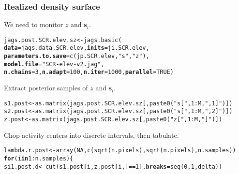 \documentclass[color=usenames,dvipsnames]{beamer}\usepackage[]{graphicx}\usepackage[]{color}
\makeatletter
\newcommand{\hlnum}[1]{\textcolor[rgb]{0.69,0.494,0}{#1}}%
\newcommand{\hlstr}[1]{\textcolor[rgb]{0.749,0.012,0.012}{#1}}%
\newcommand{\hlopt}[1]{\textcolor[rgb]{0,0,0}{#1}}%
\newcommand{\hlstd}[1]{\textcolor[rgb]{0,0,0}{#1}}%
\newcommand{\hlkwa}[1]{\textcolor[rgb]{0,0,0}{\textbf{#1}}}%
\newcommand{\hlkwb}[1]{\textcolor[rgb]{0,0.341,0.682}{#1}}%
\newcommand{\hlkwc}[1]{\textcolor[rgb]{0,0,0}{\textbf{#1}}}%
\newcommand{\hlkwd}[1]{\textcolor[rgb]{0.004,0.004,0.506}{#1}}%
\newenvironment{kframe}{%
 \def\at@end@of@kframe{}%
 \ifinner\ifhmode%
  \def\at@end@of@kframe{\end{minipage}}%
  \begin{minipage}{\columnwidth}%
 \fi\fi%
 \def\FrameCommand##1{\hskip\@totalleftmargin \hskip-\fboxsep
 \colorbox{shadecolor}{##1}\hskip-\fboxsep
     \hskip-\linewidth \hskip-\@totalleftmargin \hskip\columnwidth}%
 \MakeFramed {\advance\hsize-\width
   \@totalleftmargin\z@ \linewidth\hsize
   \@setminipage}}%
 {\par\unskip\endMakeFramed%
 \at@end@of@kframe}
\newenvironment{knitrout}{}{} %
\newcommand{\bsi}{{\bm s}_i}
\makeatother
\begin{document}
\begin{frame}[fragile]
  \frametitle{Realized density surface}
  We need to monitor $z$ and $\bsi$.
\begin{knitrout}\scriptsize
{}\color{fgcolor}\begin{kframe}
\begin{alltt}
\hlstd{jags.post.SCR.elev.sz} \hlkwb{<-} \hlkwd{jags.basic}\hlstd{(}
    \hlkwc{data}\hlstd{=jags.data.SCR.elev,} \hlkwc{inits}\hlstd{=ji.SCR.elev,}
    \hlkwc{parameters.to.save}\hlstd{=}\hlkwd{c}\hlstd{(jp.SCR.elev,}\hlstr{"s"}\hlstd{,}\hlstr{"z"}\hlstd{),}
    \hlkwc{model.file}\hlstd{=}\hlstr{"SCR-elev-v2.jag"}\hlstd{,}
    \hlkwc{n.chains}\hlstd{=}\hlnum{3}\hlstd{,} \hlkwc{n.adapt}\hlstd{=}\hlnum{100}\hlstd{,} \hlkwc{n.iter}\hlstd{=}\hlnum{1000}\hlstd{,} \hlkwc{parallel}\hlstd{=}\hlnum{TRUE}\hlstd{)}
\end{alltt}
\end{kframe}
\end{knitrout}
\pause \vfill
  Extract posterior samples of $z$ and $\bsi$. 
\begin{knitrout}\scriptsize
{}\color{fgcolor}\begin{kframe}
\begin{alltt}
\hlstd{s1.post} \hlkwb{<-} \hlkwd{as.matrix}\hlstd{(jags.post.SCR.elev.sz[,}\hlkwd{paste0}\hlstd{(}\hlstr{"s["}\hlstd{,} \hlnum{1}\hlopt{:}\hlstd{M,} \hlstr{",1]"}\hlstd{)])}
\hlstd{s2.post} \hlkwb{<-} \hlkwd{as.matrix}\hlstd{(jags.post.SCR.elev.sz[,}\hlkwd{paste0}\hlstd{(}\hlstr{"s["}\hlstd{,} \hlnum{1}\hlopt{:}\hlstd{M,} \hlstr{",2]"}\hlstd{)])}
\hlstd{z.post} \hlkwb{<-} \hlkwd{as.matrix}\hlstd{(jags.post.SCR.elev.sz[,}\hlkwd{paste0}\hlstd{(}\hlstr{"z["}\hlstd{,} \hlnum{1}\hlopt{:}\hlstd{M,} \hlstr{"]"}\hlstd{)])}
\end{alltt}
\end{kframe}
\end{knitrout}
\pause \vfill
Chop activity centers into discrete intervals, then tabulate.
\begin{knitrout}\scriptsize
{}\color{fgcolor}\begin{kframe}
\begin{alltt}
\hlstd{lambda.r.post} \hlkwb{<-} \hlkwd{array}\hlstd{(}\hlnum{NA}\hlstd{,} \hlkwd{c}\hlstd{(}\hlkwd{sqrt}\hlstd{(n.pixels),} \hlkwd{sqrt}\hlstd{(n.pixels), n.samples))}
\hlkwa{for}\hlstd{(i} \hlkwa{in} \hlnum{1}\hlopt{:}\hlstd{n.samples) \{}
    \hlstd{si1.post.d} \hlkwb{<-} \hlkwd{cut}\hlstd{(s1.post[i,z.post[i,]}\hlopt{==}\hlnum{1}\hlstd{],} \hlkwc{breaks}\hlstd{=}\hlkwd{seq}\hlstd{(}\hlnum{0}\hlstd{,} \hlnum{1}\hlstd{, delta))}

\end{alltt}
\end{kframe}
\end{knitrout}
\end{frame}
\end{document}
